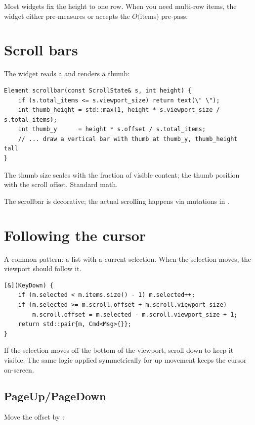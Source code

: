 Most \maya{} widgets fix the height to one row. When you need
multi-row items, the widget either pre-measures or accepts the
$O($items$)$ pre-pass.

\section{Scroll bars}

The  widget reads a  and
renders a thumb:

\begin{lstlisting}
Element scrollbar(const ScrollState& s, int height) {
    if (s.total_items <= s.viewport_size) return text(\" \");
    int thumb_height = std::max(1, height * s.viewport_size / s.total_items);
    int thumb_y      = height * s.offset / s.total_items;
    // ... draw a vertical bar with thumb at thumb_y, thumb_height tall
}
\end{lstlisting}

The thumb size scales with the fraction of visible content; the
thumb position with the scroll offset. Standard math.

The scrollbar is decorative; the actual scrolling happens via
 mutations in .

\section{Following the cursor}

A common pattern: a list with a current selection. When the
selection moves, the viewport should follow it.

\begin{lstlisting}
[&](KeyDown) {
    if (m.selected < m.items.size() - 1) m.selected++;
    if (m.selected >= m.scroll.offset + m.scroll.viewport_size)
        m.scroll.offset = m.selected - m.scroll.viewport_size + 1;
    return std::pair{m, Cmd<Msg>{}};
}
\end{lstlisting}

If the selection moves off the bottom of the viewport, scroll
down to keep it visible. The same logic applied symmetrically for
up movement keeps the cursor on-screen.

\subsection*{PageUp/PageDown}

Move the offset by :

